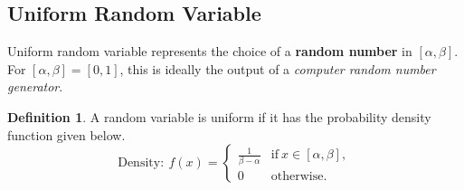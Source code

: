 \documentclass[12pt,a4paper]{article}
\theoremstyle{definition}
\theoremstyle{definition}
\newtheorem*{definition}{Definition}
\theoremstyle{definition}
\theoremstyle{definition}
\theoremstyle{remark}
\theoremstyle{definition}
\begin{document}
\subsection{Uniform Random Variable}
Uniform random variable represents the choice of a \textbf{random number} in $[\alpha,\beta]$. For $[\alpha,\beta]=[0,1]$, this is ideally the output of a \textit{computer random number generator}.
\begin{tcolorbox}[colback=white]
	\begin{definition}
		A random variable is uniform if it has the probability density function given below. \[
		\text{Density}:\ f(x)=\begin{cases}
		\displaystyle\frac{1}{\beta-\alpha} &\text{if}\ x\in[\alpha,\beta],\\
		0 &\text{otherwise}.
		\end{cases}
		\]
	\end{definition}
\end{tcolorbox}\
\
\end{document}
